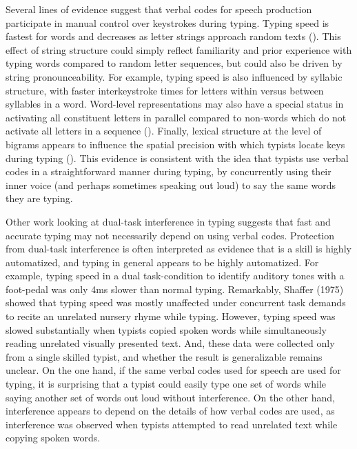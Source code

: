 \documentclass[,man,floatsintext]{apa6}
\begin{document}
Several lines of evidence suggest that verbal codes for speech production participate in manual control over keystrokes during typing. Typing speed is fastest for words and decreases as letter strings approach random texts (). This effect of string structure could simply reflect familiarity and prior experience with typing words compared to random letter sequences, but could also be driven by string pronounceability. For example, typing speed is also influenced by syllabic structure, with faster interkeystroke times for letters within versus between syllables in a word. Word-level representations may also have a special status in activating all constituent letters in parallel compared to non-words which do not activate all letters in a sequence (). Finally, lexical structure at the level of bigrams appears to influence the spatial precision with which typists locate keys during typing (). This evidence is consistent with the idea that typists use verbal codes in a straightforward manner during typing, by concurrently using their inner voice (and perhaps sometimes speaking out loud) to say the same words they are typing.

Other work looking at dual-task interference in typing suggests that fast and accurate typing may not necessarily depend on using verbal codes. Protection from dual-task interference is often interpreted as evidence that is a skill is highly automatized, and typing in general appears to be highly automatized. For example, typing speed in a dual task-condition to identify auditory tones with a foot-pedal was only 4ms slower than normal typing. Remarkably, Shaffer (1975) showed that typing speed was mostly unaffected under concurrent task demands to recite an unrelated nursery rhyme while typing. However, typing speed was slowed substantially when typists copied spoken words while simultaneously reading unrelated visually presented text. And, these data were collected only from a single skilled typist, and whether the result is generalizable remains unclear. On the one hand, if the same verbal codes used for speech are used for typing, it is surprising that a typist could easily type one set of words while saying another set of words out loud without interference. On the other hand, interference appears to depend on the details of how verbal codes are used, as interference was observed when typists attempted to read unrelated text while copying spoken words.
\end{document}
